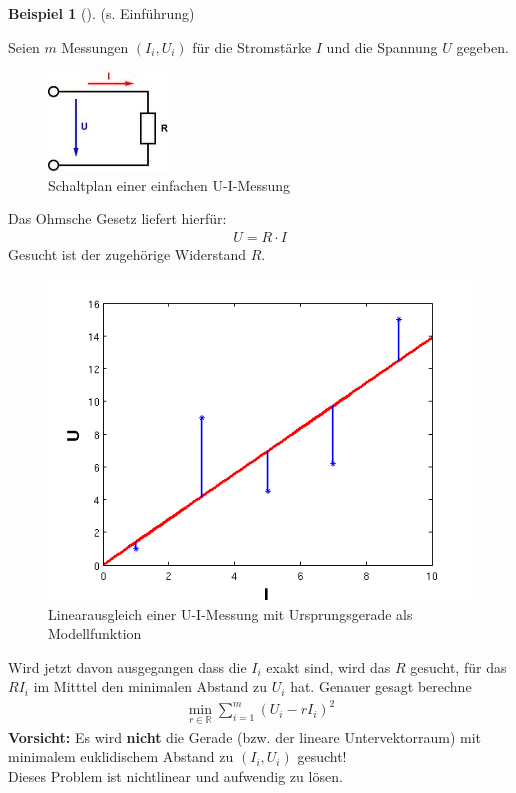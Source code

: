 \documentclass[ngerman,fontsize=11pt, paper=a4, parskip=half, titlepage=true, toc=bib]{scrbook}
\theoremstyle{definition}
\newtheorem{Bsp}[Def]{Beispiel}
\theoremstyle{plain}
\newcommand{\R}{\mathds{R}}
\newcommand{\subsectione}[1]{\addtocounter{Def}{1}\subsection{#1}}
\newenvironment{Bspe}[1][]{ %
	\begin{Bsp}[#1]
	}
	{
	\end{Bsp}
	\addtocounter{subsection}{1}
}
\begin{document}
  \begin{Bspe}
  	(s. Einführung)
  	
  	Seien $m$ Messungen $(I_i, U_i)$ für die Stromstärke $I$ und die Spannung $U$ gegeben. \\
  	
  	\begin{figure}
  		\parbox{\linewidth}{
  			\centering
  			\includegraphics{images/ohmsche.jpeg}
  		}
  		\caption{Schaltplan einer einfachen U-I-Messung}
  	\end{figure}
  	
  	Das Ohmsche Gesetz liefert hierfür:
  	\begin{gather*}
  	U=R\cdot I
  	\end{gather*}
  	Gesucht ist der zugehörige Widerstand $R$.\\
  	
  	\begin{figure}
  		\parbox{\linewidth}{
  			\centering
  			\includegraphics[width=0.5\linewidth]{images/linausgl2.png}
  		}
  		\caption{Linearausgleich einer U-I-Messung mit Ursprungsgerade als Modellfunktion}
  	\end{figure}
  	
  	Wird jetzt davon ausgegangen dass die $I_i$ exakt sind, wird das $R$ gesucht, 
  	für das $RI_i$ im Mitttel den minimalen Abstand zu $U_i$ hat.
  	Genauer gesagt berechne
  	\begin{gather*}
  	\min_{r\in\R} \sum_{i=1}^{m}(U_i-rI_i)^2
  	\end{gather*}
  	\textbf{Vorsicht: } Es wird \textbf{nicht} die Gerade (bzw. der lineare Untervektorraum) mit 
  	minimalem euklidischem Abstand zu $(I_i,U_i)$ gesucht! \\
  	Dieses Problem ist nichtlinear und aufwendig zu lösen.
  \end{Bspe}
\end{document}
